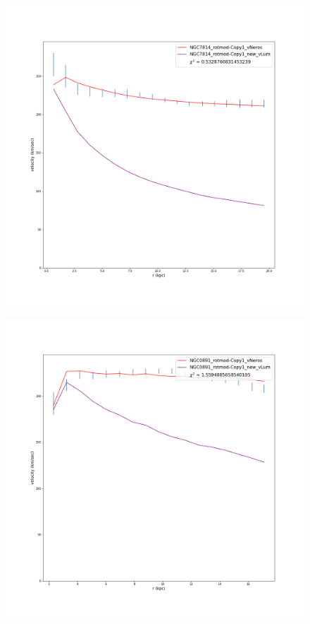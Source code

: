 \documentclass[reprint,%
 amsmath,amssymb,
 aps,
]{revtex4-1}
\begin{document}
 \begin{figure}
\centering
\begin{minipage}{.5\textwidth}
  \centering
  \includegraphics[width=.95\linewidth]{Updated_Graphs_withnewcolorsandfonts/NGC7814_rotmod-Copy1_XueSofue.png}
  \label{fig:n7814sparc}
\end{minipage}%
\begin{minipage}{.5\textwidth}
  \centering
  \includegraphics[width=.95\linewidth]{Updated_Graphs_withnewcolorsandfonts/NGC0891_rotmod-Copy1_XueSofue.png}

\end{minipage}
\end{figure}
\end{document}
